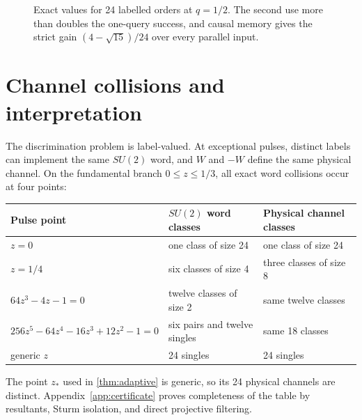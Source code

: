 \documentclass[11pt]{article}
\theoremstyle{definition}
\begin{document}
\begin{figure}[t]
\centering
{}
\caption{Exact values for 24 labelled orders at $q=1/2$.  The second use
more than doubles the one-query success, and causal memory gives the strict
gain $(4-\sqrt{15})/24$ over every parallel input.}
\label{fig:values}
\end{figure}

\section{Channel collisions and interpretation}

The discrimination problem is label-valued.  At exceptional pulses, distinct
labels can implement the same $SU(2)$ word, and $W$ and $-W$ define the same
physical channel.  On the fundamental branch $0\le z\le1/3$, all exact word
collisions occur at four points:
\begin{center}
\begin{tabular}{@{}lll@{}}
\toprule
Pulse point & $SU(2)$ word classes & Physical channel classes \\
\midrule
$z=0$ & one class of size 24 & one class of size 24 \\
$z=1/4$ & six classes of size 4 & three classes of size 8 \\
$64z^3-4z-1=0$ & twelve classes of size 2 & same twelve classes \\
$256z^5-64z^4-16z^3+12z^2-1=0$ & six pairs and twelve singles & same 18 classes \\
generic $z$ & 24 singles & 24 singles \\
\bottomrule
\end{tabular}
\end{center}
The point $z_*$ used in \cref{thm:adaptive} is generic, so its 24 physical
channels are distinct.  Appendix~\ref{app:certificate} proves completeness of
the table by resultants, Sturm isolation, and direct projective filtering.
\end{document}
